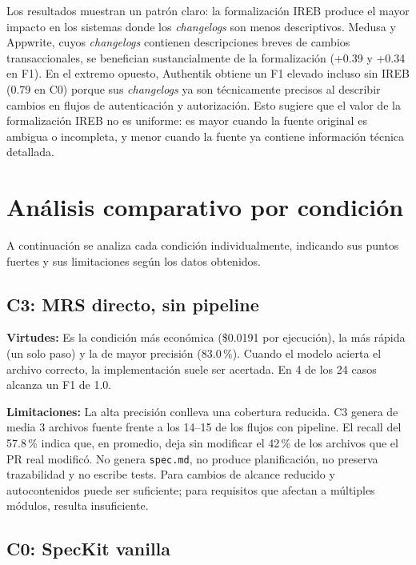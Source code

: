 Los resultados muestran un patr\'on claro: la formalizaci\'on IREB produce el mayor impacto en los sistemas donde los \emph{changelogs} son menos descriptivos. Medusa y Appwrite, cuyos \emph{changelogs} contienen descripciones breves de cambios transaccionales, se benefician sustancialmente de la formalizaci\'on (+0.39 y +0.34 en F1). En el extremo opuesto, Authentik obtiene un F1 elevado incluso sin IREB (0.79 en C0) porque sus \emph{changelogs} ya son t\'ecnicamente precisos al describir cambios en flujos de autenticaci\'on y autorizaci\'on. Esto sugiere que el valor de la formalizaci\'on IREB no es uniforme: es mayor cuando la fuente original es ambigua o incompleta, y menor cuando la fuente ya contiene informaci\'on t\'ecnica detallada.

\FloatBarrier
\section{An\'alisis comparativo por condici\'on}

A continuaci\'on se analiza cada condici\'on individualmente, indicando sus puntos fuertes y sus limitaciones seg\'un los datos obtenidos.

\subsection{C3: MRS directo, sin pipeline}

\textbf{Virtudes:} Es la condici\'on m\'as econ\'omica (\$0.0191 por ejecuci\'on), la m\'as r\'apida (un solo paso) y la de mayor precisi\'on (83.0\,\%). Cuando el modelo acierta el archivo correcto, la implementaci\'on suele ser acertada. En 4 de los 24 casos alcanza un F1 de 1.0.

\textbf{Limitaciones:} La alta precisi\'on conlleva una cobertura reducida. C3 genera de media 3 archivos fuente frente a los 14--15 de los flujos con pipeline. El recall del 57.8\,\% indica que, en promedio, deja sin modificar el 42\,\% de los archivos que el PR real modific\'o. No genera \texttt{spec.md}, no produce planificaci\'on, no preserva trazabilidad y no escribe tests. Para cambios de alcance reducido y autocontenidos puede ser suficiente; para requisitos que afectan a m\'ultiples m\'odulos, resulta insuficiente.

\subsection{C0: SpecKit vanilla}

